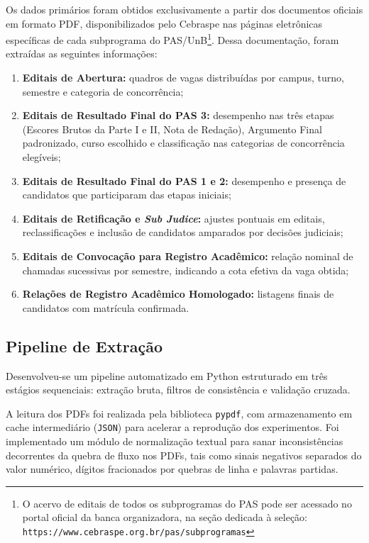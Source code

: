 \documentclass[12pt]{article}
\begin{document}
Os dados primários foram obtidos exclusivamente a partir dos documentos oficiais em formato PDF, disponibilizados pelo Cebraspe nas páginas eletrônicas específicas de cada subprograma do PAS/UnB\footnote{O acervo de editais de todos os subprogramas do PAS pode ser acessado no portal oficial da banca organizadora, na seção dedicada à seleção: \texttt{https://www.cebraspe.org.br/pas/subprogramas}}. Dessa documentação, foram extraídas as seguintes informações:
\begin{enumerate}
    \item \textbf{Editais de Abertura:} quadros de vagas distribuídas por campus, turno, semestre e categoria de concorrência;
    \item \textbf{Editais de Resultado Final do PAS 3:} desempenho nas três etapas (Escores Brutos da Parte I e II, Nota de Redação), Argumento Final padronizado, curso escolhido e classificação nas categorias de concorrência elegíveis;
    \item \textbf{Editais de Resultado Final do PAS 1 e 2:} desempenho e presença de candidatos que participaram das etapas iniciais;
    \item \textbf{Editais de Retificação e \textit{Sub Judice}:} ajustes pontuais em editais, reclassificações e inclusão de candidatos amparados por decisões judiciais;
    \item \textbf{Editais de Convocação para Registro Acadêmico:} relação nominal de chamadas sucessivas por semestre, indicando a cota efetiva da vaga obtida;
    \item \textbf{Relações de Registro Acadêmico Homologado:} listagens finais de candidatos com matrícula confirmada.
\end{enumerate}

\subsection{Pipeline de Extração}

Desenvolveu-se um pipeline automatizado em Python estruturado em três estágios sequenciais: extração bruta, filtros de consistência e validação cruzada.

A leitura dos PDFs foi realizada pela biblioteca \texttt{pypdf}, com armazenamento em cache intermediário (\texttt{JSON}) para acelerar a reprodução dos experimentos. Foi implementado um módulo de normalização textual para sanar inconsistências decorrentes da quebra de fluxo nos PDFs, tais como sinais negativos separados do valor numérico, dígitos fracionados por quebras de linha e palavras partidas.
\end{document}
